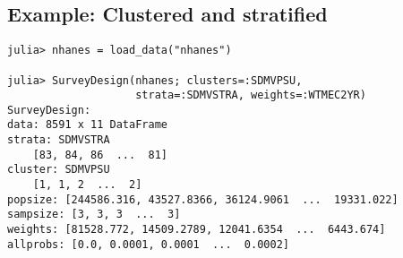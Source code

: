 \documentclass{juliacon}
\begin{document}








\subsection{Example: Clustered and stratified}

\begin{lstlisting}
julia> nhanes = load_data("nhanes")

julia> SurveyDesign(nhanes; clusters=:SDMVPSU,
                    strata=:SDMVSTRA, weights=:WTMEC2YR)
SurveyDesign:
data: 8591 x 11 DataFrame
strata: SDMVSTRA
    [83, 84, 86  ...  81]
cluster: SDMVPSU
    [1, 1, 2  ...  2]
popsize: [244586.316, 43527.8366, 36124.9061  ...  19331.022]
sampsize: [3, 3, 3  ...  3]
weights: [81528.772, 14509.2789, 12041.6354  ...  6443.674]
allprobs: [0.0, 0.0001, 0.0001  ...  0.0002]
\end{lstlisting}
\end{document}
